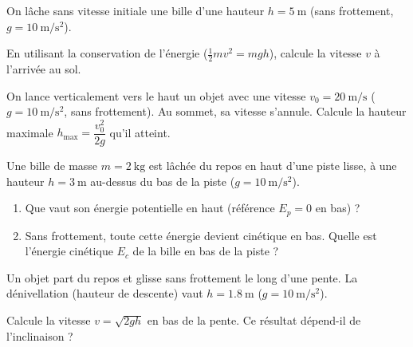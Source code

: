 \documentclass[11pt,a4paper]{article}
\begin{document}

\begin{exo}
On lâche sans vitesse initiale une bille d'une hauteur $h=\qty{5}{\metre}$ (sans frottement,
$g=\qty{10}{\metre\per\second\squared}$).
\begin{center}
\end{center}
En utilisant la conservation de l'énergie ($\tfrac12 m v^2=mgh$), calcule la vitesse $v$ à l'arrivée
au sol.
\end{exo}

\begin{exo}
On lance verticalement vers le haut un objet avec une vitesse $v_0=\qty{20}{\metre\per\second}$
($g=\qty{10}{\metre\per\second\squared}$, sans frottement). Au sommet, sa vitesse s'annule.
Calcule la hauteur maximale $h_{\max}=\dfrac{v_0^2}{2g}$ qu'il atteint.
\end{exo}

\begin{exo}
Une bille de masse $m=\qty{2}{\kilogram}$ est lâchée du repos en haut d'une piste lisse, à une hauteur
$h=\qty{3}{\metre}$ au-dessus du bas de la piste ($g=\qty{10}{\metre\per\second\squared}$).
\begin{enumerate}[label=\alph*)]
  \item Que vaut son énergie potentielle en haut (référence $E_p=0$ en bas) ?
  \item Sans frottement, toute cette énergie devient cinétique en bas. Quelle est l'énergie cinétique
        $E_c$ de la bille en bas de la piste ?
\end{enumerate}
\end{exo}

\begin{exo}
Un objet part du repos et glisse sans frottement le long d'une pente. La dénivellation (hauteur de
descente) vaut $h=\qty{1,8}{\metre}$ ($g=\qty{10}{\metre\per\second\squared}$).
\begin{center}
\end{center}
Calcule la vitesse $v=\sqrt{2gh}$ en bas de la pente. Ce résultat dépend-il de l'inclinaison ?
\end{exo}
\end{document}
